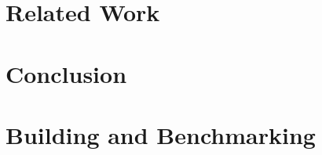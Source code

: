 \documentclass[11pt,a4paper]{article}
\begin{document}


\section{Related Work}
\label{sec:related}



\section{Conclusion}
\label{sec:conclusion}



\appendix
\section{Building and Benchmarking}
\label{sec:appendix-build}




\end{document}
